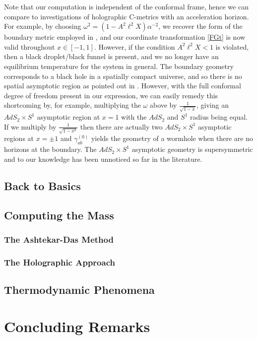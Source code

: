 \documentclass[
twoside,
openright,
frontopenright
]{dmathesis}
\begin{document}
Note that our computation is independent of the conformal frame, hence
we can compare to investigations of holographic C-metrics with an
acceleration horizon. For example, by choosing $\omega^2 =
(1-A^{2}\ell^{2}X)\alpha^{-2}$, we recover the form of the boundary metric
employed in \cite{Hubeny:2009kz}, and our coordinate transformation
\eqref{FGt} is now valid throughout $x\in[-1,1]$. However, if the condition
$ A^{2}\ell^{2} X <1$ is violated, then a black droplet/black funnel is present,
and we no longer have an equilibrium temperature for the system in general.
The boundary geometry corresponds to a black hole in a spatially compact
universe, and so there is no spatial asymptotic region as pointed out
in \cite{Hubeny:2009kz}. However, with the full conformal degree of
freedom present in our expression, we can easily remedy this shortcoming
by, for example, multiplying the $\omega$ above by $\frac{1}{\sqrt{1-x}}$,
giving an $AdS_{2}\times S^{1}$ asymptotic region at $x=1$ with the $AdS_{2}$
and $S^{1}$ radius being equal. If we multiply by $\frac{1}{\sqrt{1-x^2}}$ then
there are actually two $AdS_{2}\times S^{1}$ asymptotic regions at $x=\pm1$
and $\gamma^{(0)}_{ab}$ yields the geometry of a wormhole when there are no
horizons at the boundary.
The $AdS_{2}\times S^{1}$ asymptotic geometry is supersymmetric
and to our knowledge has been unnoticed so far in the literature.

\section{Back to Basics}
\label{sec:basics}

\section{Computing the Mass}
\label{sec:mass-comput}

\subsection{The Ashtekar-Das Method}
\label{sec:ashtekar-das}

\subsection{The Holographic Approach}
\label{sec:holo}

\section{Thermodynamic Phenomena}
\label{sec:phenomena}


\chapter{Concluding Remarks}


%
%


{}


\end{document}
